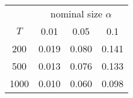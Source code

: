 % 
\begin{tabular}{cccc}
  \hline
  & \multicolumn{3}{c}{nominal size $\alpha$} \\
 $T$ & 0.01 & 0.05 & 0.1 \\
 \hline
200 & 0.019 & 0.080 & 0.141 \\ 
  500 & 0.013 & 0.076 & 0.133 \\ 
  1000 & 0.010 & 0.060 & 0.098 \\ 
   \hline
\end{tabular}
